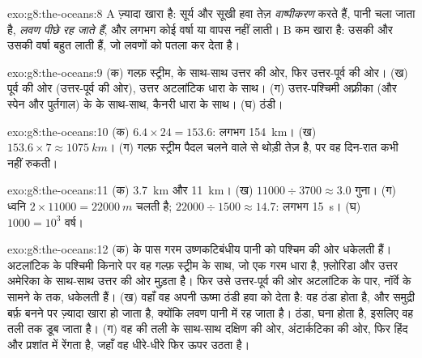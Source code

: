 \begin{solution}{exo:g8:the-oceans:8}
 A ज़्यादा खारा है: सूर्य और सूखी हवा तेज़ \emph{वाष्पीकरण} करते हैं, पानी चला
जाता है, \emph{लवण पीछे रह जाते हैं}, और लगभग कोई वर्षा या  \emph{} वापस
नहीं लाती।  B कम खारा है: उसकी  और उसकी वर्षा बहुत \emph{} लाती
हैं, जो लवणों को पतला कर देता
है।
\end{solution}

\begin{solution}{exo:g8:the-oceans:9}
(क) गल्फ़ स्ट्रीम,  के साथ-साथ उत्तर की ओर, फिर उत्तर-पूर्व की ओर। (ख) पूर्व की ओर
(उत्तर-पूर्व की ओर), उत्तर अटलांटिक धारा के साथ। (ग) उत्तर-पश्चिमी अफ़्रीका (और स्पेन
और पुर्तगाल) के  के साथ-साथ, कैनरी धारा के साथ। (घ)
ठंडी।
\end{solution}

\begin{solution}{exo:g8:the-oceans:10}
(क) $6.4 \times 24 = 153.6$: लगभग \qty{154}{km}। (ख) $153.6 \times 7
\approx \qty{1075}{km}$।
(ग) गल्फ़ स्ट्रीम पैदल चलने वाले से थोड़ी तेज़ है, पर वह दिन-रात कभी नहीं
रुकती।
\end{solution}

\begin{solution}{exo:g8:the-oceans:11}
(क) \qty{3.7}{km} और \qty{11}{km}। (ख) $11000 \div 3700 \approx 3.0$
गुना। (ग) ध्वनि $2 \times 11000 = \qty{22000}{m}$ चलती है;
$22000
\div 1500 \approx 14.7$: लगभग \qty{15}{s}। (घ) $1000 = 10^3$ वर्ष।
\end{solution}

\begin{solution}{exo:g8:the-oceans:12}
(क)  के पास  गरम उष्णकटिबंधीय पानी को पश्चिम की ओर धकेलती हैं।
अटलांटिक के पश्चिमी किनारे पर वह गल्फ़ स्ट्रीम के साथ, जो एक गरम धारा है, फ़्लोरिडा और
उत्तर अमेरिका के साथ-साथ उत्तर की ओर मुड़ता है। फिर  उसे उत्तर-पूर्व की ओर
अटलांटिक के पार, नॉर्वे के सामने के  तक, धकेलती हैं। (ख) वहाँ वह अपनी ऊष्मा
ठंडी हवा को देता है: वह ठंडा होता है, और समुद्री बर्फ़ बनने पर ज़्यादा खारा हो जाता है,
क्योंकि लवण पानी में रह जाता है। ठंडा,  घना होता है, इसलिए वह तली तक डूब जाता
है। (ग) वह  की तली के साथ-साथ दक्षिण की ओर, अंटार्कटिका की ओर, फिर हिंद और
प्रशांत  में रेंगता है, जहाँ वह धीरे-धीरे फिर ऊपर उठता है।
\end{solution}


